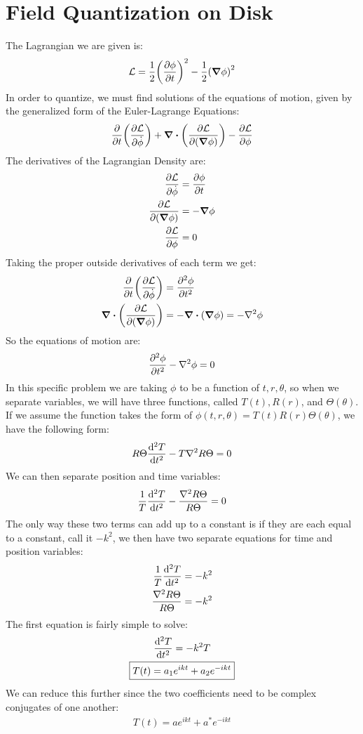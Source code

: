 \documentclass[12pt]{article}
\renewcommand{\L}{\mathcal{L}}
\begin{document}
\section{Field Quantization on Disk}
The Lagrangian we are given is:
\begin{align*}
  \L=\frac12\qty(\pdv{\phi}{t})^2-\frac12\qty(\grad\phi)^2
\end{align*}
In order to quantize, we must find solutions of the equations of motion, given by the generalized form of the Euler-Lagrange Equations:
\begin{align*}
  \pdv{t}\qty(\pdv{\L}{\dot{\phi}})
  +\div\qty(\pdv{\L}{(\grad{\phi})})
  -\pdv{\L}{\phi}
\end{align*}
The derivatives of the Lagrangian Density are:
\begin{align*}
  \pdv{\L}{\dot{\phi}}&=\pdv{\phi}{t}\\
  \pdv{\L}{(\grad{\phi})}&=-\grad{\phi}\\
  \pdv{\L}{\phi}&=0
\end{align*}
Taking the proper outside derivatives of each term we get:
\begin{align*}
  \pdv{t}\qty(\pdv{\L}{\dot{\phi}})&=\pdv[2]{\phi}{t}\\
  \div\qty(\pdv{\L}{(\grad{\phi})})&=-\div{(\grad{\phi})}=-\laplacian{\phi}
\end{align*}
So the equations of motion are:
\begin{align*}
  \pdv[2]{\phi}{t}-\laplacian{\phi}=0
\end{align*}
In this specific problem we are taking $\phi$ to be a function of $t,r,\theta$, so when we separate variables, we will have three functions, called $T(t),R(r)$, and $\Theta(\theta)$. If we assume the function takes the form of $\phi(t,r,\theta)=T(t)R(r)\Theta(\theta)$, we have the following form:
\begin{align*}
  R\Theta\dv[2]{T}{t}-T\laplacian{R\Theta}=0
\end{align*}
We can then separate position and time variables:
\begin{align*}
  \frac1T\dv[2]{T}{t}-\frac{\laplacian{R\Theta}}{R\Theta}=0
\end{align*}
The only way these two terms can add up to a constant is if they are each equal to a constant, call it $-k^2$, we then have two separate equations for time and position variables:
\begin{align*}
  \frac1T\dv[2]{T}{t}&=-k^2\\
  \frac{\laplacian{R\Theta}}{R\Theta}&=-k^2
\end{align*}
The first equation is fairly simple to solve:
\begin{gather*}
  \dv[2]{T}{t}=-k^2T\\
  \boxed{T(t)=a_1e^{ikt}+a_2e^{-ikt}}
\end{gather*}
We can reduce this further since the two coefficients need to be complex conjugates of one another:
\begin{align*}
  T(t)=ae^{ikt}+a^*e^{-ikt}
\end{align*}
\end{document}
